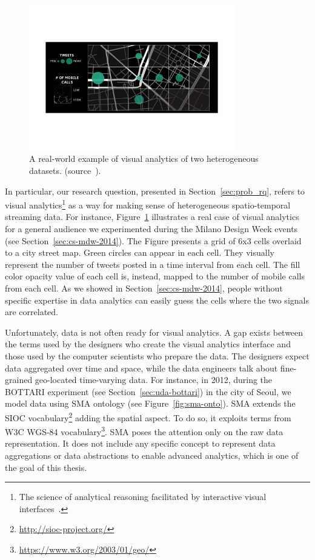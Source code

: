 \begin{figure}[t]
\centering
\includegraphics[width=0.8\textwidth]{img/real-world-rep}
\caption{A real-world example of visual analytics of two heterogeneous datasets. (source~\cite{DBLP:conf/semweb/BalduiniV15}).}
\label{fig:real-world-rep}
\end{figure} 

In particular, our research question, presented in Section~\ref{sec:prob_rq}, refers to visual analytics\footnote{The science of analytical reasoning facilitated by interactive visual interfaces~\cite{cook2005illuminating}.} as a way for making sense of heterogeneous spatio-temporal streaming data.
For instance, Figure~\ref{fig:real-world-rep} illustrates a real case of visual analytics for a general audience we experimented during the Milano Design Week events (see Section~\ref{sec:cs-mdw-2014}).
The Figure presents a grid of 6x3 cells overlaid to a city street map. Green circles can appear in each cell. They visually represent the number of tweets posted in a time interval from each cell. The fill color opacity value of each cell is, instead, mapped to the number of mobile calls from each cell. As we showed in Section~\ref{sec:cs-mdw-2014}, people without specific expertise in data analytics can easily guess the cells where the two signals are correlated.

Unfortunately, data is not often ready for visual analytics.
A gap exists between the terms used by the designers who create the visual analytics interface and those used by the computer scientists who prepare the data. The designers expect data aggregated over time and space, while the data engineers talk about fine-grained geo-located time-varying data.
For instance, in 2012, during the BOTTARI experiment (see Section~\ref{sec:uda-bottari}) in the city of Seoul, we model data using SMA ontology (see Figure~\ref{fig:sma-onto}).
SMA extends the SIOC vocabulary\footnote{\url{http://sioc-project.org/}} adding the spatial aspect. To do so, it exploits terms from W3C WGS-84 vocabulary\footnote{\url{https://www.w3.org/2003/01/geo/}}.
SMA poses the attention only on the raw data representation.
It does not include any specific concept to represent data aggregations or data abstractions to enable advanced analytics, which is one of the goal of this thesis.

